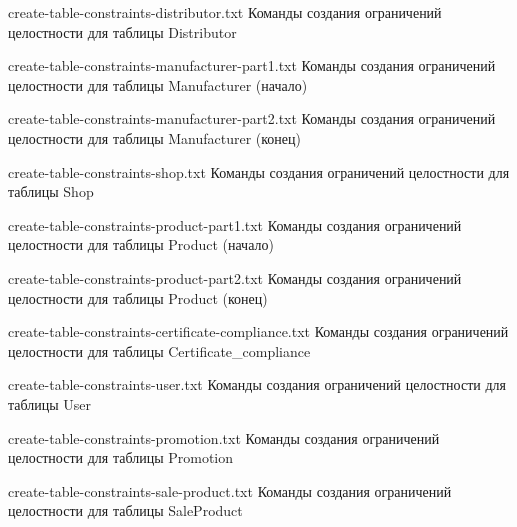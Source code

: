 {create-table-constraints-distributor.txt} %
{Команды создания ограничений целостности для таблицы Distributor} %

{create-table-constraints-manufacturer-part1.txt} %
{Команды создания ограничений целостности для таблицы Manufacturer (начало)} %

{create-table-constraints-manufacturer-part2.txt} %
{Команды создания ограничений целостности для таблицы Manufacturer (конец)} %

{create-table-constraints-shop.txt} %
{Команды создания ограничений целостности для таблицы Shop} %

{create-table-constraints-product-part1.txt} %
{Команды создания ограничений целостности для таблицы Product (начало)} %

{create-table-constraints-product-part2.txt} %
{Команды создания ограничений целостности для таблицы Product (конец)} %

{create-table-constraints-certificate-compliance.txt} %
{Команды создания ограничений целостности для таблицы Certificate\_compliance} %

{create-table-constraints-user.txt} %
{Команды создания ограничений целостности для таблицы User} %

{create-table-constraints-promotion.txt} %
{Команды создания ограничений целостности для таблицы Promotion} %

\clearpage

{create-table-constraints-sale-product.txt} %
{Команды создания ограничений целостности для таблицы SaleProduct} %

